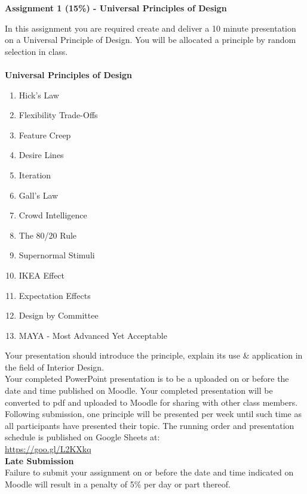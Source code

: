 
	
\begin{flushleft}
\Large\textbf{Assignment 1 (15\%) - Universal Principles of Design}\\
\end{flushleft}

In this assignment you are required create and deliver a 10 minute presentation on a Universal Principle of Design.  You will be allocated a principle by random selection in class.\\
\\
\textbf{Universal Principles of Design}
\begin{enumerate}
	\item Hick's Law
	\item Flexibility Trade-Offs
	\item Feature Creep
	\item Desire Lines
	\item Iteration
	\item Gall's Law
	\item Crowd Intelligence
	\item The 80/20 Rule
	\item Supernormal Stimuli
	\item IKEA Effect
	\item Expectation Effects
	\item Design by Committee
	\item MAYA - Most Advanced Yet Acceptable
\end{enumerate}

Your presentation should introduce the principle, explain its use \& application in the field of Interior Design.\\

Your completed PowerPoint presentation is to be a uploaded on or before the date and time published on Moodle.  Your completed presentation will be converted to pdf and uploaded to Moodle for sharing with other class members.\\

Following submission, one principle will be presented per week until such time as all participants have presented their topic.  The running order and presentation schedule is published on Google Sheets at:\\
\href{https://goo.gl/L2KXkq}{https://goo.gl/L2KXkq}\\

\textbf{Late Submission}\\
Failure to submit your assignment on or before the date and time indicated on Moodle will result in a penalty of 5\% per day or part thereof.  

